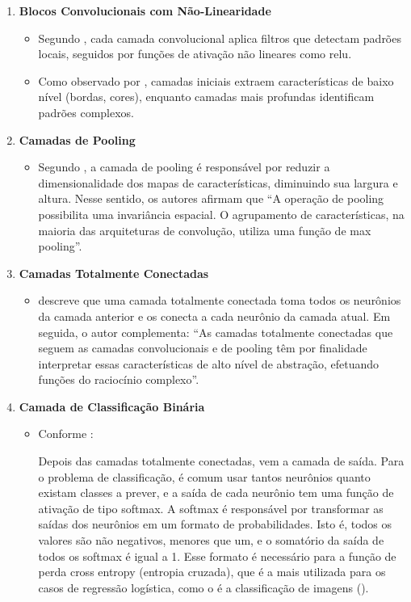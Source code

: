 \begin{enumerate} 
    \item \textbf{Blocos Convolucionais com Não-Linearidade}
    \begin{itemize}
        \item Segundo , cada camada convolucional aplica filtros que detectam padrões locais, seguidos por funções de ativação não lineares como \gls{relu}.
        \item Como observado por , camadas iniciais extraem características de baixo nível (bordas, cores), enquanto camadas mais profundas identificam padrões complexos.
    \end{itemize}
    
    \item \textbf{Camadas de Pooling}
    \begin{itemize}
        \item Segundo , a camada de pooling é responsável por reduzir a dimensionalidade dos mapas de características, diminuindo sua largura e altura. Nesse sentido, os autores afirmam que “A operação de pooling possibilita uma invariância espacial. O agrupamento de características, na maioria das arquiteturas de convolução, utiliza uma função de max pooling”.
    \end{itemize}
    \item \textbf{Camadas Totalmente Conectadas}
    \begin{itemize}
        \item {} descreve que uma camada totalmente conectada toma todos os neurônios da camada anterior e os conecta a cada neurônio da camada atual. Em seguida, o autor complementa: “As camadas totalmente conectadas que seguem as camadas convolucionais e de pooling têm por finalidade interpretar essas características de alto nível de abstração, efetuando funções do raciocínio complexo”.
    \end{itemize}
    \item \textbf{Camada de Classificação Binária}
    \begin{itemize}
        \item Conforme :
        \begin{citacao}
            Depois das camadas totalmente conectadas, vem a camada de saída. Para o problema de classificação, é comum usar tantos neurônios quanto existam classes a prever, e a saída de cada neurônio tem uma função de ativação de tipo softmax. A softmax é responsável por transformar as saídas dos neurônios em um formato de probabilidades. Isto é, todos os valores são não negativos, menores que um, e o somatório da saída de todos os softmax é igual a 1. Esse formato é necessário para a função de perda cross entropy (entropia cruzada), que é a mais utilizada para os casos de regressão logística, como o é a classificação de imagens ().

\end{citacao}
\end{itemize}
\end{enumerate}
